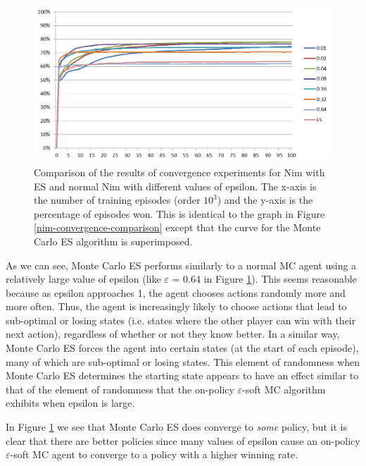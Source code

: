 \documentclass[11pt,a4paper]{report}
\begin{document}
\begin{figure}[htbp]
	\begin{center}
		\includegraphics[width=\linewidth]{Nim_PerformanceResults_Comparison_001_to_064_and_ES.png}
		\caption{Comparison of the results of convergence experiments for Nim with ES and normal Nim with different values of epsilon. The x-axis is the number of training episodes (order $10^3$) and the y-axis is the percentage of episodes won. This is identical to the graph in Figure \ref{nim-convergence-comparison} except that the curve for the Monte Carlo ES algorithm is superimposed.}
		\label{nim-convergence-comparison-with-ES}
	\end{center}
\end{figure}

As we can see, Monte Carlo ES performs similarly to a normal MC agent using a relatively large value of epsilon (like $\varepsilon$ = 0.64 in Figure \ref{nim-convergence-comparison-with-ES}). This seems reasonable because as epsilon approaches 1, the agent chooses actions randomly more and more often. Thus, the agent is increasingly likely to choose actions that lead to sub-optimal or losing states (i.e. states where the other player can win with their next action), regardless of whether or not they know better. In a similar way, Monte Carlo ES forces the agent into certain states (at the start of each episode), many of which are sub-optimal or losing states. This element of randomness when Monte Carlo ES determines the starting state appears to have an effect similar to that of the element of randomness that the on-policy $\varepsilon$-soft MC algorithm exhibits when epsilon is large.

In Figure \ref{nim-convergence-comparison-with-ES} we see that Monte Carlo ES does converge to \emph{some} policy, but it is clear that there are better policies since many values of epsilon cause an on-policy $\varepsilon$-soft MC agent to converge to a policy with a higher winning rate.
\end{document}

